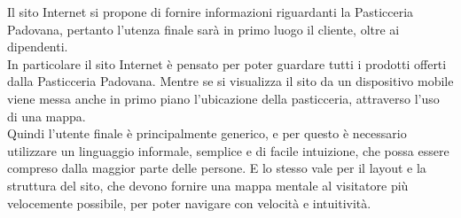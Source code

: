 Il sito Internet si propone di fornire informazioni riguardanti la Pasticceria Padovana, pertanto
l'utenza finale sarà in primo luogo il cliente, oltre ai dipendenti.\\
In particolare il sito Internet è pensato per poter guardare tutti i prodotti offerti dalla
Pasticceria Padovana. Mentre se si visualizza il sito da un dispositivo mobile viene messa anche 
in primo piano l'ubicazione della pasticceria, attraverso l'uso di una mappa.\\
Quindi l'utente finale è principalmente generico, e per questo è necessario utilizzare un linguaggio
informale, semplice e di facile intuizione, che possa essere compreso dalla maggior parte delle
persone. E lo stesso vale per il layout e la struttura del sito, che devono fornire una mappa mentale
al visitatore più velocemente possibile, per poter navigare con velocità e intuitività.

